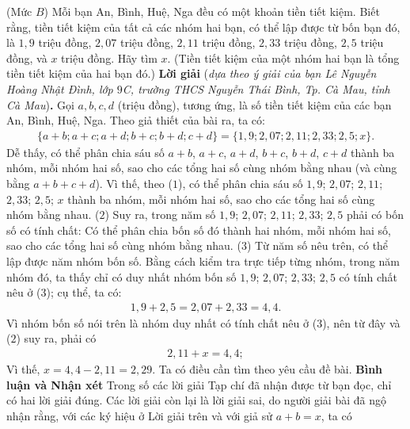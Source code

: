 \begin{multicols}{2}
	\setlength{\abovedisplayskip}{5pt}
	\setlength{\belowdisplayskip}{5pt}
	{}
	(Mức $B$) Mỗi bạn An, Bình, Huệ, Nga đều có một khoản tiền tiết kiệm. Biết rằng, tiền tiết kiệm của tất cả các nhóm hai bạn, có thể lập được từ bốn bạn đó, là $1,9$ triệu đồng, $2,07$ triệu đồng, $2,11$ triệu đồng, $2,33$ triệu đồng, $2,5$ triệu đồng, và $x$ triệu đồng. Hãy tìm $x$.
	\vskip 0.05cm
	(Tiền tiết kiệm của một nhóm hai bạn là tổng tiền tiết kiệm của hai bạn đó.)
	\vskip 0.05cm
	\textbf{Lời giải} (\textit{dựa theo ý giải của bạn Lê Nguyễn Hoàng Nhật Đình, lớp $9$C, trường THCS Nguyễn Thái Bình, Tp. Cà Mau, tỉnh Cà Mau})\textbf{.}
	\vskip 0.05cm
	Gọi $a, b, c, d$ (triệu đồng), tương ứng, là số tiền tiết kiệm của các bạn An, Bình, Huệ, Nga.
	\vskip 0.05cm
	Theo giả thiết của bài ra, ta có:
	\begin{align*}
		\{a + b; a + c; a + d; b + c; b + d; c + d\} = \{1,9; 2,07; 2,11; 2,33; 2,5; x\}. \tag{$1$}
	\end{align*}
	Dễ thấy, có thể phân chia sáu số $a + b$, $a + c$, $a + d$, $b + c$, $b + d$, $c + d$ thành ba nhóm, mỗi nhóm hai số, sao cho các tổng hai số cùng nhóm bằng nhau (và cùng bằng $a + b + c + d$).
	\vskip 0.05cm
	Vì thế, theo ($1$), có thể phân chia sáu số $1,9$; $2,07$; $2,11$; $2,33$; $2,5$; $x$ thành ba nhóm, mỗi nhóm hai số, sao cho các tổng hai số cùng nhóm bằng nhau. \hfill ($2$)
	\vskip 0.05cm
	Suy ra, trong năm số $1,9$; $2,07$; $2,11$; $2,33$; $2,5$ phải có bốn số có tính chất: Có thể phân chia bốn số đó thành hai nhóm, mỗi nhóm hai số, sao cho các tổng hai số cùng nhóm bằng nhau. \hfill ($3$)
	\vskip 0.05cm
	Từ năm số nêu trên, có thể lập được năm nhóm bốn số. Bằng cách kiểm tra trực tiếp từng nhóm, trong năm nhóm đó, ta thấy chỉ có duy nhất nhóm bốn số $1,9$; $2,07$; $2,33$; $2,5$ có tính chất nêu ở ($3$); cụ thể, ta có:
	\begin{align*}
		1,9 + 2,5 = 2,07 + 2,33 = 4,4.
	\end{align*}
	Vì nhóm bốn số nói trên là nhóm duy nhất có tính chất nêu ở ($3$), nên từ đây và ($2$) suy ra, phải có
	\begin{align*}
		2,11 + x = 4,4;
	\end{align*}
	Vì thế, $x = 4,4 - 2,11 = 2,29$.
	\vskip 0.05cm
	Ta có điều cần tìm theo yêu cầu đề bài.
	\vskip 0.05cm
	\textbf{Bình luận và Nhận xét}
	\vskip 0.05cm	
	Trong số các lời giải Tạp chí đã nhận được từ bạn đọc, chỉ có hai lời giải đúng. Các lời giải còn lại là lời giải sai, do người giải bài đã ngộ nhận rằng, với các ký hiệu ở Lời giải trên và với giả sử $a + b = x$, ta có

\end{multicols}
